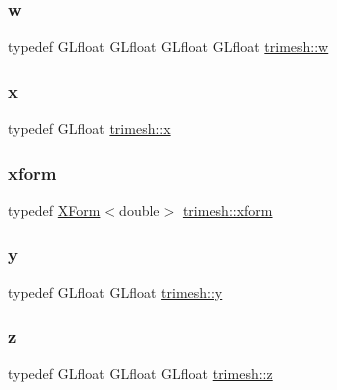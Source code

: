 \subsubsection{\texorpdfstring{w}{w}}
{\footnotesize\ttfamily typedef G\+Lfloat G\+Lfloat G\+Lfloat G\+Lfloat \hyperlink{namespacetrimesh_acd577db8a2f95fe39ececb95e98a6c71}{trimesh\+::w}}

\mbox{\label{namespacetrimesh_a3365d1b1a1bc5d8e9c844cf589a8c4a8}} 
\subsubsection{\texorpdfstring{x}{x}}
{\footnotesize\ttfamily typedef G\+Lfloat \hyperlink{namespacetrimesh_a3365d1b1a1bc5d8e9c844cf589a8c4a8}{trimesh\+::x}}

\mbox{\label{namespacetrimesh_ad504958f2f56e393991b848986a8459f}} 
\subsubsection{\texorpdfstring{xform}{xform}}
{\footnotesize\ttfamily typedef \hyperlink{classtrimesh_1_1XForm}{X\+Form}$<$double$>$ \hyperlink{namespacetrimesh_ad504958f2f56e393991b848986a8459f}{trimesh\+::xform}}

\mbox{\label{namespacetrimesh_a56b35d0eb7039be92fcc4867080c7419}} 
\subsubsection{\texorpdfstring{y}{y}}
{\footnotesize\ttfamily typedef G\+Lfloat G\+Lfloat \hyperlink{namespacetrimesh_a56b35d0eb7039be92fcc4867080c7419}{trimesh\+::y}}

\mbox{\label{namespacetrimesh_a42d0d86cc8db1d2be48121fe5e52fc67}} 
\subsubsection{\texorpdfstring{z}{z}}
{\footnotesize\ttfamily typedef G\+Lfloat G\+Lfloat G\+Lfloat \hyperlink{namespacetrimesh_a42d0d86cc8db1d2be48121fe5e52fc67}{trimesh\+::z}}



